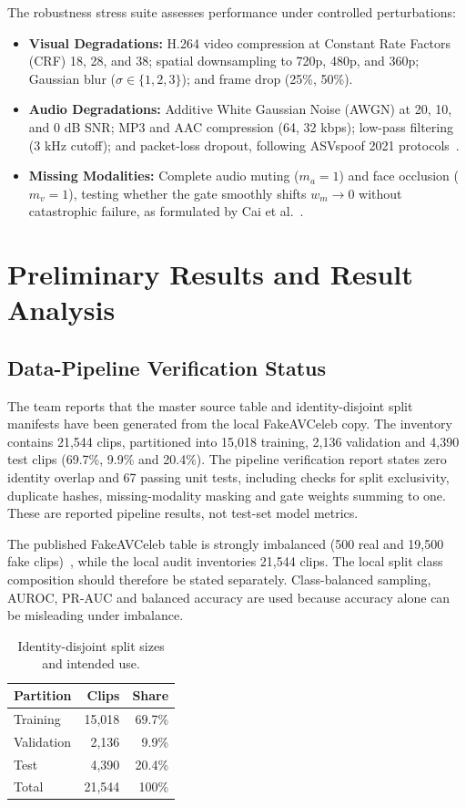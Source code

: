 \documentclass[conference]{IEEEtran}
\begin{document}
The robustness stress suite assesses performance under controlled perturbations:
\begin{itemize}
    \item \textbf{Visual Degradations:} H.264 video compression at Constant Rate Factors (CRF) 18, 28, and 38; spatial downsampling to 720p, 480p, and 360p; Gaussian blur ($\sigma \in \{1, 2, 3\}$); and frame drop (25\%, 50\%).
    \item \textbf{Audio Degradations:} Additive White Gaussian Noise (AWGN) at 20, 10, and 0 dB SNR; MP3 and AAC compression (64, 32 kbps); low-pass filtering (3 kHz cutoff); and packet-loss dropout, following ASVspoof 2021 protocols~\cite{liu2023asvspoof}.
    \item \textbf{Missing Modalities:} Complete audio muting ($m_a=1$) and face occlusion ($m_v=1$), testing whether the gate smoothly shifts $w_m \to 0$ without catastrophic failure, as formulated by Cai et al.~\cite{cai2025modality}.
\end{itemize}

\section{Preliminary Results and Result Analysis}

\subsection{Data-Pipeline Verification Status}
The team reports that the master source table and identity-disjoint split manifests have been generated from the local FakeAVCeleb copy. The inventory contains 21,544 clips, partitioned into 15,018 training, 2,136 validation and 4,390 test clips (69.7\%, 9.9\% and 20.4\%). The pipeline verification report states zero identity overlap and 67 passing unit tests, including checks for split exclusivity, duplicate hashes, missing-modality masking and gate weights summing to one. These are reported pipeline results, not test-set model metrics.

The published FakeAVCeleb table is strongly imbalanced (500 real and 19,500 fake clips)~\cite{khalid2021}, while the local audit inventories 21,544 clips. The local split class composition should therefore be stated separately. Class-balanced sampling, AUROC, PR-AUC and balanced accuracy are used because accuracy alone can be misleading under imbalance.

\begin{table}[t]
\caption{Identity-disjoint split sizes and intended use.}
\label{tab:splits}
\centering
\scriptsize
\setlength{\tabcolsep}{3pt}
\begin{tabular}{lrr}
\toprule
\textbf{Partition} & \textbf{Clips} & \textbf{Share} \\
\midrule
Training & 15,018 & 69.7\% \\
Validation & 2,136 & 9.9\% \\
Test & 4,390 & 20.4\% \\
Total & 21,544 & 100\% \\
\bottomrule
\end{tabular}
\end{table}
\end{document}
